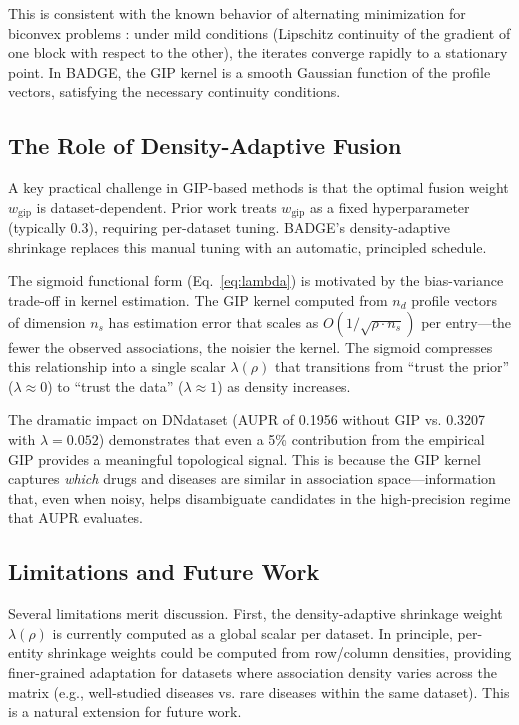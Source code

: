 \documentclass{oup-authoring-template}
\begin{document}
This is consistent with the known behavior of alternating minimization for biconvex problems \cite{tseng2001}: under mild conditions (Lipschitz continuity of the gradient of one block with respect to the other), the iterates converge rapidly to a stationary point. In BADGE, the GIP kernel is a smooth Gaussian function of the profile vectors, satisfying the necessary continuity conditions.

\subsection{The Role of Density-Adaptive Fusion}

A key practical challenge in GIP-based methods is that the optimal fusion weight $w_{\text{gip}}$ is dataset-dependent. Prior work treats $w_{\text{gip}}$ as a fixed hyperparameter (typically 0.3), requiring per-dataset tuning. BADGE's density-adaptive shrinkage replaces this manual tuning with an automatic, principled schedule.

The sigmoid functional form (Eq.~\ref{eq:lambda}) is motivated by the bias-variance trade-off in kernel estimation. The GIP kernel computed from $n_d$ profile vectors of dimension $n_s$ has estimation error that scales as $O(1/\sqrt{\rho \cdot n_s})$ per entry---the fewer the observed associations, the noisier the kernel. The sigmoid compresses this relationship into a single scalar $\lambda(\rho)$ that transitions from ``trust the prior'' ($\lambda \approx 0$) to ``trust the data'' ($\lambda \approx 1$) as density increases.

The dramatic impact on DNdataset (AUPR of 0.1956 without GIP vs. 0.3207 with $\lambda = 0.052$) demonstrates that even a 5\% contribution from the empirical GIP provides a meaningful topological signal. This is because the GIP kernel captures \emph{which} drugs and diseases are similar in association space---information that, even when noisy, helps disambiguate candidates in the high-precision regime that AUPR evaluates.

\subsection{Limitations and Future Work}

Several limitations merit discussion. First, the density-adaptive shrinkage weight $\lambda(\rho)$ is currently computed as a global scalar per dataset. In principle, per-entity shrinkage weights could be computed from row/column densities, providing finer-grained adaptation for datasets where association density varies across the matrix (e.g., well-studied diseases vs. rare diseases within the same dataset). This is a natural extension for future work.
\end{document}
